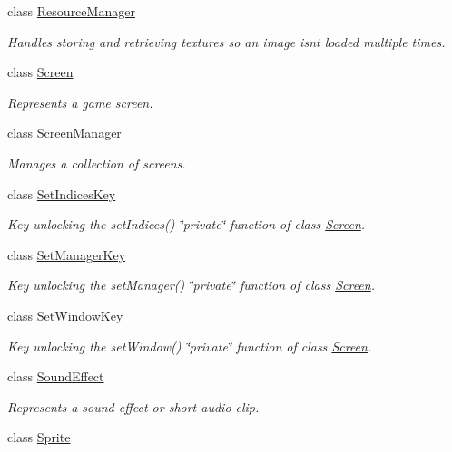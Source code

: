 \begin{DoxyCompactItemize}
class \hyperlink{classnta_1_1ResourceManager}{Resource\+Manager}
\begin{DoxyCompactList}\small\item\em Handles storing and retrieving textures so an image isn\textquotesingle{}t loaded multiple times. \end{DoxyCompactList}\item 
class \hyperlink{classnta_1_1Screen}{Screen}
\begin{DoxyCompactList}\small\item\em Represents a game screen. \end{DoxyCompactList}\item 
class \hyperlink{classnta_1_1ScreenManager}{Screen\+Manager}
\begin{DoxyCompactList}\small\item\em Manages a collection of screens. \end{DoxyCompactList}\item 
class \hyperlink{classnta_1_1SetIndicesKey}{Set\+Indices\+Key}
\begin{DoxyCompactList}\small\item\em Key unlocking the set\+Indices() \char`\"{}private\char`\"{} function of class \hyperlink{classnta_1_1Screen}{Screen}. \end{DoxyCompactList}\item 
class \hyperlink{classnta_1_1SetManagerKey}{Set\+Manager\+Key}
\begin{DoxyCompactList}\small\item\em Key unlocking the set\+Manager() \char`\"{}private\char`\"{} function of class \hyperlink{classnta_1_1Screen}{Screen}. \end{DoxyCompactList}\item 
class \hyperlink{classnta_1_1SetWindowKey}{Set\+Window\+Key}
\begin{DoxyCompactList}\small\item\em Key unlocking the set\+Window() \char`\"{}private\char`\"{} function of class \hyperlink{classnta_1_1Screen}{Screen}. \end{DoxyCompactList}\item 
class \hyperlink{classnta_1_1SoundEffect}{Sound\+Effect}
\begin{DoxyCompactList}\small\item\em Represents a sound effect or short audio clip. \end{DoxyCompactList}\item 
class \hyperlink{classnta_1_1Sprite}{Sprite}

\end{DoxyCompactItemize}
